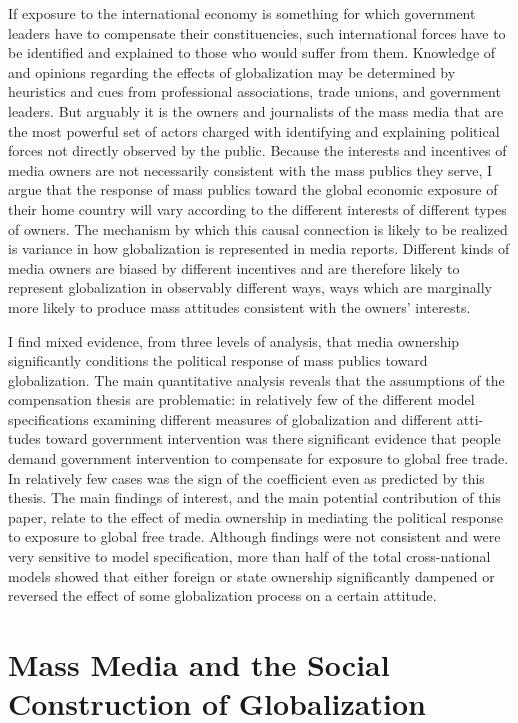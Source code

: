 \documentclass[12pt]{report}
\begin{document}
If exposure to the international economy is something for which government
leaders have to compensate their constituencies, such international
forces have to be identified and explained to those who would suffer
from them. Knowledge of and opinions regarding the effects of globalization
may be determined by heuristics and cues from professional associations,
trade unions, and government leaders. But arguably it is the owners
and journalists of the mass media that are the most powerful set of
actors charged with identifying and explaining political forces not
directly observed by the public. Because the interests and incentives
of media owners are not necessarily consistent with the mass publics
they serve, I argue that the response of mass publics toward the global
economic exposure of their home country will vary according to the
different interests of different types of owners. The mechanism by
which this causal connection is likely to be realized is variance
in how globalization is represented in media reports. Different kinds
of media owners are biased by different incentives and are therefore
likely to represent globalization in observably different ways, ways
which are marginally more likely to produce mass attitudes consistent
with the owners\textquoteright{} interests.

I find mixed evidence, from three levels of analysis, that media ownership
significantly conditions the political response of mass publics toward
globalization. The main quantitative analysis reveals that the assumptions
of the compensation thesis are problematic: in relatively few of the
different model specifications examining different measures of globalization
and different atti- tudes toward government intervention was there
significant evidence that people demand government intervention to
compensate for exposure to global free trade. In relatively few cases
was the sign of the coefficient even as predicted by this thesis.
The main findings of interest, and the main potential contribution
of this paper, relate to the effect of media ownership in mediating
the political response to exposure to global free trade. Although
findings were not consistent and were very sensitive to model specification,
more than half of the total cross-national models showed that either
foreign or state ownership significantly dampened or reversed the
effect of some globalization process on a certain attitude.


\chapter{Mass Media and the Social Construction of Globalization}
\end{document}
